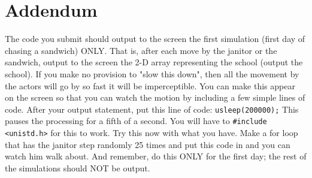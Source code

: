 \documentclass[
    subject = {{Comp Sci}},
    course = {{1570}},
    section = {{101}},
    assignment = {{Assignment 10 \\ Final Project}},
    name = {{Student One ; Student Two}},
    email = {{stosid@mst.edu ; sttsid@mst.edu}}
]{eey-homework}
\begin{document}
\section{Addendum}
The code you submit should output to the screen the first simulation (first day of chasing a sandwich) ONLY.
That is, after each move by the janitor or the sandwich, output to the screen the 2-D array representing the school (output the school).
If you make no provision to "slow this down", then all the movement by the actors will go by so fast it will be imperceptible.
You can make this appear on the screen so that you can watch the motion by including a few simple lines of code.
After your output statement, put this line of code: \verb|usleep(200000);| This pauses the processing for a fifth of a second.
You will have to \verb|#include <unistd.h>| for this to work.
Try this now with what you have.
Make a for loop that has the janitor step randomly 25 times and put this code in and you can watch him walk about.
And remember, do this ONLY for the first day; the rest of the simulations should NOT be output.
\end{document}

